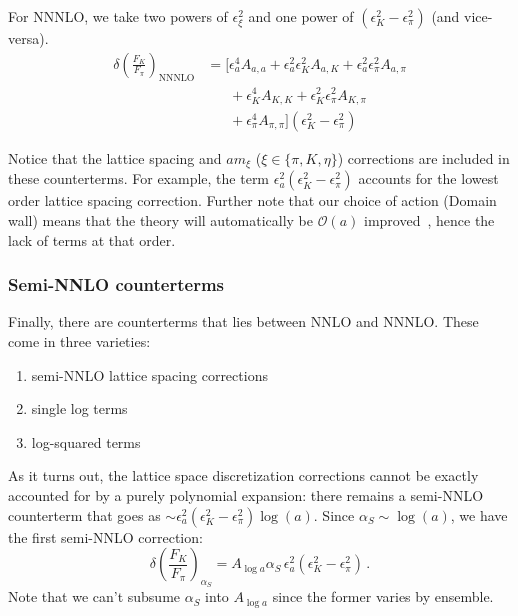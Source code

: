 \documentclass[prd,tightenlines,preprintnumbers,showpacs,superscriptaddress,notitlepage,eqsecnum,floatfix,notitlepage]{revtex4-1}
\begin{document}
For NNNLO, we take two powers of $\epsilon^2_\xi$ and one power of $(\epsilon_K^2 - \epsilon_\pi^2)$ (and vice-versa).
\begin{align}
\delta\left(\frac{F_K}{F_\pi}\right)_\text{NNNLO} &= \bigg[
\epsilon_a^4  A_{a, a} + \epsilon_a^2 \epsilon_K^2  A_{a, K} + \epsilon_a^2 \epsilon_\pi^2  A_{a, \pi} \\ \nonumber
&\phantom{[ =} + \epsilon_K^4  A_{K, K} + \epsilon_K^2 \epsilon_\pi^2  A_{K, \pi} \\ \nonumber
&\phantom{[ =} + \epsilon_\pi^4  A_{\pi, \pi} \bigg] (\epsilon_K^2 - \epsilon_\pi^2)
\end{align}

Notice that the lattice spacing and $am_\xi$ ($\xi \in \{\pi, K, \eta\}$) corrections are included in these counterterms. For example, the term $\epsilon^2_a (\epsilon^2_K - \epsilon^2_\pi)$ accounts for the lowest order lattice spacing correction. Further note that our choice of action (Domain wall) means that the theory will automatically be $\mathcal{O}(a)$ improved~\cite{Berkowitz:2017opd}, hence the lack of terms at that order.

\subsubsection{Semi-NNLO counterterms}
Finally, there are counterterms that lies between NNLO and NNNLO. These come in three varieties: 
\begin{enumerate}
	\item semi-NNLO lattice spacing corrections
	\item single log terms
	\item log-squared terms
\end{enumerate}
As it turns out, the lattice space discretization corrections cannot be exactly accounted for by a purely polynomial expansion: there remains a semi-NNLO counterterm that goes as $\sim \epsilon_a^2 (\epsilon_K^2 - \epsilon_\pi^2) \log(a)$. Since $\alpha_S \sim \log(a)$, we have the first semi-NNLO correction:
\begin{equation}
\delta\left(\frac{F_K}{F_\pi}\right)_{\alpha_S} =
A_{\log a} \alpha_S \, \epsilon_a^2  (\epsilon_K^2 - \epsilon_\pi^2) \, .
\end{equation}
Note that we can't subsume $\alpha_S$ into $A_{\log a}$ since the former varies by ensemble. 
\end{document}
